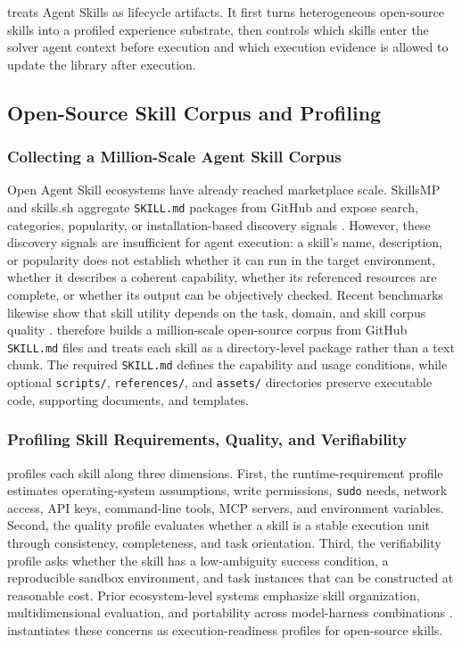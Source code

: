 \ours treats Agent Skills as lifecycle artifacts. It first turns heterogeneous open-source skills into a profiled experience substrate, then controls which skills enter the solver agent context before execution and which execution evidence is allowed to update the library after execution.

\subsection{Open-Source Skill Corpus and Profiling}

\subsubsection{Collecting a Million-Scale Agent Skill Corpus}
Open Agent Skill ecosystems have already reached marketplace scale. SkillsMP and skills.sh aggregate \texttt{SKILL.md} packages from GitHub and expose search, categories, popularity, or installation-based discovery signals \citep{skillsmp2026,skillssh2026}. However, these discovery signals are insufficient for agent execution: a skill's name, description, or popularity does not establish whether it can run in the target environment, whether it describes a coherent capability, whether its referenced resources are complete, or whether its output can be objectively checked. Recent benchmarks likewise show that skill utility depends on the task, domain, and skill corpus quality \citep{li2026skillsbench,zhang2026skillflow}. \ours therefore builds a million-scale open-source corpus from GitHub \texttt{SKILL.md} files and treats each skill as a directory-level package rather than a text chunk. The required \texttt{SKILL.md} defines the capability and usage conditions, while optional \texttt{scripts/}, \texttt{references/}, and \texttt{assets/} directories preserve executable code, supporting documents, and templates.

\subsubsection{Profiling Skill Requirements, Quality, and Verifiability}
\ours profiles each skill along three dimensions. First, the runtime-requirement profile estimates operating-system assumptions, write permissions, \texttt{sudo} needs, network access, API keys, command-line tools, MCP servers, and environment variables. Second, the quality profile evaluates whether a skill is a stable execution unit through consistency, completeness, and task orientation. Third, the verifiability profile asks whether the skill has a low-ambiguity success condition, a reproducible sandbox environment, and task instances that can be constructed at reasonable cost. Prior ecosystem-level systems emphasize skill organization, multidimensional evaluation, and portability across model-harness combinations \citep{skvm2026,liang2026skillnet,li2026organizing}. \ours instantiates these concerns as execution-readiness profiles for open-source skills.

